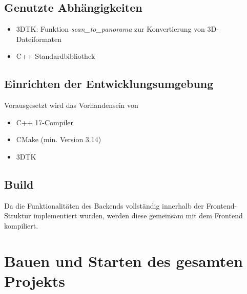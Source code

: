 \documentclass[a4paper,10pt]{scrartcl}
\begin{document}
\subsection{Genutzte Abhängigkeiten}

\begin{itemize}
    \item 3DTK: Funktion \textit{scan\_to\_panorama} zur Konvertierung von 3D-Dateiformaten
    \item C++ Standardbibliothek
\end{itemize}

\subsection{Einrichten der Entwicklungsumgebung}
Vorausgesetzt wird das Vorhandensein von
\begin{itemize}
	\item C++ 17-Compiler
	\item CMake (min. Version 3.14)
	\item 3DTK
\end{itemize}

\subsection{Build}

Da die Funktionalitäten des Backends vollständig innerhalb der Frontend-Struktur implementiert wurden, werden diese gemeinsam mit dem Frontend kompiliert.

\newpage

\section{Bauen und Starten des gesamten Projekts}
\end{document}
